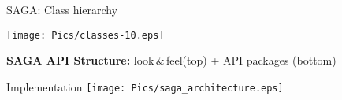 \documentclass[%
  pdf,
  colorBG,
  slideColor,
  frames,
  ogf
]{prosper}
\newcommand{\B}[1]{\textbf{#1}}
\newcommand{\lf}{look\,\&\,feel\xspace}
\begin{document}

 \begin{slide}{SAGA: Class hierarchy}
  \begin{center}
   \texttt{[image: Pics/classes-10.eps]}
  \end{center}
  {\footnotesize\B{SAGA API Structure:} \lf (top) + API packages (bottom)}
 \end{slide}
 
 
 \begin{slide}{Implementation}
   \texttt{[image: Pics/saga\_architecture.eps]}
 \end{slide}




\end{document}

